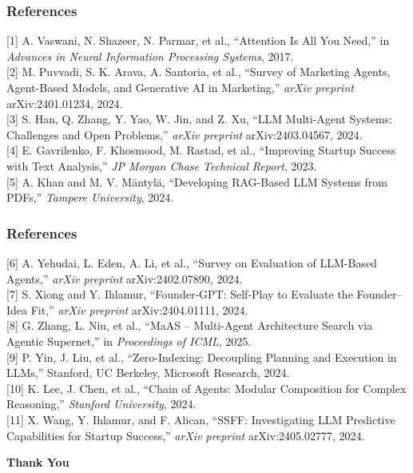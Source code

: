 \documentclass{beamer}
\begin{document}
\begin{frame}
\frametitle{References}
\footnotesize{

[1] A. Vaswani, N. Shazeer, N. Parmar, et al., “Attention Is All You Need,” in \textit{Advances in Neural Information Processing Systems}, 2017. \\

[2] M. Puvvadi, S. K. Arava, A. Santoria, et al., “Survey of Marketing Agents, Agent-Based Models, and Generative AI in Marketing,” \textit{arXiv preprint} arXiv:2401.01234, 2024. \\

[3] S. Han, Q. Zhang, Y. Yao, W. Jin, and Z. Xu, “LLM Multi-Agent Systems: Challenges and Open Problems,” \textit{arXiv preprint} arXiv:2403.04567, 2024. \\

[4] E. Gavrilenko, F. Khosmood, M. Rastad, et al., “Improving Startup Success with Text Analysis,” \textit{JP Morgan Chase Technical Report}, 2023. \\

[5] A. Khan and M. V. Mäntylä, “Developing RAG-Based LLM Systems from PDFs,” \textit{Tampere University}, 2024. \\
}
\end{frame}

\begin{frame}
\frametitle{References}
\footnotesize{
[6] A. Yehudai, L. Eden, A. Li, et al., “Survey on Evaluation of LLM-Based Agents,” \textit{arXiv preprint} arXiv:2402.07890, 2024. \\

[7] S. Xiong and Y. Ihlamur, “Founder-GPT: Self-Play to Evaluate the Founder–Idea Fit,” \textit{arXiv preprint} arXiv:2404.01111, 2024. \\

[8] G. Zhang, L. Niu, et al., “MaAS – Multi-Agent Architecture Search via Agentic Supernet,” in \textit{Proceedings of ICML}, 2025. \\

[9] P. Yin, J. Liu, et al., “Zero-Indexing: Decoupling Planning and Execution in LLMs,” Stanford, UC Berkeley, Microsoft Research, 2024. \\

[10] K. Lee, J. Chen, et al., “Chain of Agents: Modular Composition for Complex Reasoning,” \textit{Stanford University}, 2024. \\

[11] X. Wang, Y. Ihlamur, and F. Alican, “SSFF: Investigating LLM Predictive Capabilities for Startup Success,” \textit{arXiv preprint} arXiv:2405.02777, 2024. \\

}
\end{frame}

\begin{frame}
\centering
\Huge \textbf{Thank You}
\end{frame}
\end{document}
